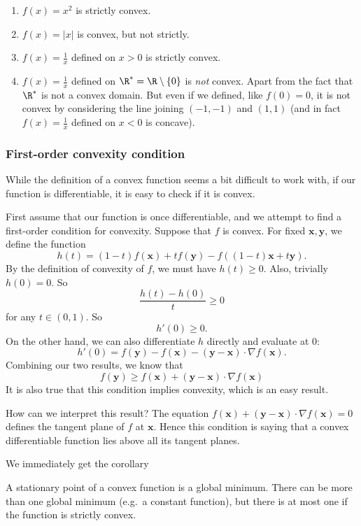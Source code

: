 \documentclass[a4paper]{article}
\begin{document}
\begin{eg}\leavevmode
  \begin{enumerate}
    \item $f(x) = x^2$ is strictly convex.
    \item $f(x) = |x|$ is convex, but not strictly.
    \item $f(x) = \frac{1}{x}$ defined on $x > 0$ is strictly convex.
    \item $f(x) = \frac{1}{x}$ defined on $\R^* = \R \setminus \{0\}$ is \emph{not} convex. Apart from the fact that $\R^*$ is not a convex domain. But even if we defined, like $f(0) = 0$, it is not convex by considering the line joining $(-1, -1)$ and $(1, 1)$ (and in fact $f(x) = \frac{1}{x}$ defined on $x < 0$ is concave).
  \end{enumerate}
\end{eg}
\subsubsection{First-order convexity condition}
While the definition of a convex function seems a bit difficult to work with, if our function is differentiable, it is easy to check if it is convex.

First assume that our function is once differentiable, and we attempt to find a first-order condition for convexity. Suppose that $f$ is convex. For fixed $\mathbf{x}, \mathbf{y}$, we define the function
\[
  h(t) = (1 - t)f(\mathbf{x}) + tf(\mathbf{y}) - f((1 - t)\mathbf{x} + t \mathbf{y}).
\]
By the definition of convexity of $f$, we must have $h(t) \geq 0$. Also, trivially $h(0) = 0$. So
\[
  \frac{h(t) - h(0)}{t} \geq 0
\]
for any $t\in (0, 1)$. So
\[
  h'(0) \geq 0.
\]
On the other hand, we can also differentiate $h$ directly and evaluate at $0$:
\[
  h'(0) = f(\mathbf{y}) - f(\mathbf{x}) - (\mathbf{y} - \mathbf{x})\cdot \nabla f (\mathbf{x}).
\]
Combining our two results, we know that
\[
  f(\mathbf{y}) \geq f(\mathbf{x}) + (\mathbf{y} - \mathbf{x})\cdot \nabla f(\mathbf{x}) \tag{$\dagger$}
\]
It is also true that this condition implies convexity, which is an easy result.

How can we interpret this result? The equation $f(\mathbf{x}) + (\mathbf{y} - \mathbf{x}) \cdot \nabla f(\mathbf{x}) = 0$ defines the tangent plane of $f$ at $\mathbf{x}$. Hence this condition is saying that a convex differentiable function lies above all its tangent planes.

We immediately get the corollary
\begin{cor}
  A stationary point of a convex function is a global minimum. There can be more than one global minimum (e.g.\ a constant function), but there is at most one if the function is strictly convex.
\end{cor}
\end{document}
